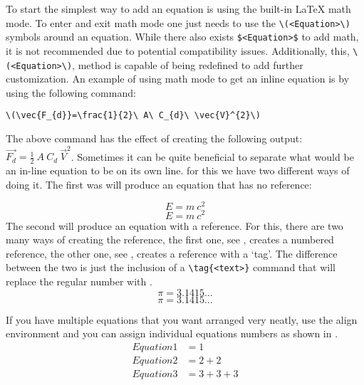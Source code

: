   To start the simplest way to add an equation is using the built-in \LaTeX{} math mode. 
  To enter and exit math mode one just needs to use the \lstinline|\(<Equation>\)| symbols around an equation. While there also exists \lstinline|$<Equation>$| to add math, it is not recommended due to potential compatibility issues. Additionally, this, \lstinline|\(<Equation>\)|, method is capable of being redefined to add further customization. 
  An example of using math mode to get an inline equation is by using the following command:
  
	\begin{Center}
		\lstinline|\(\vec{F_{d}}=\frac{1}{2}\ A\ C_{d}\ \vec{V}^{2}\)|
	\end{Center}
  
  The above command has the effect of creating the following output: \(\vec{F_{d}}=\frac{1}{2}\ A\ C_{d}\ \vec{V}^{2}\).
  Sometimes it can be quite beneficial to separate what would be an in-line equation to be on its own line. for this we have two different ways of doing it. The first was will produce an equation that has no reference:
  
  \[
    E = m\ c^2
  \] %
  \begin{equation*}
    E = m\ c^2
  \end{equation*}
  The second will produce an equation with a reference. For this, there are two many ways of creating the reference, the first one, see , creates a numbered reference, the other one, see , creates a reference with a `tag'. The difference between the two is just the inclusion of a \lstinline|\tag{<text>}| command that will replace the regular number with .
  \begin{equation}\label{eq:Eq}
    \pi = 3.1415...
  \end{equation}
  \begin{equation}\tag{Constant pi}\label{eq:customTag}
    \pi = 3.1415...
  \end{equation}
  
  If you have multiple equations that you want arranged very neatly, use the align environment and you can assign individual equations numbers as shown in .
  \begin{align}%
    \label{eq:multiref:a} Equation1 & = 1\\
    \label{eq:multiref:b} Equation2 & = 2 + 2\\
    \label{eq:multiref:c} Equation3 & = 3 + 3 + 3
  \end{align}
  
